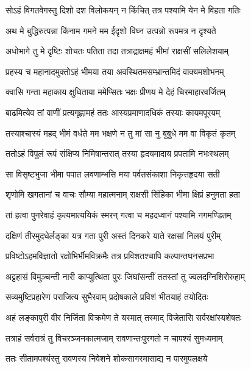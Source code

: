 \twolineshloka
{सोऽहं विगतवेगस्तु दिशो दश विलोकयन्}
{न किंचित् तत्र पश्यामि येन मे विहता गतिः} %

\twolineshloka
{अथ मे बुद्धिरुत्पन्ना किंनाम गमने मम}
{ईदृशो विघ्न उत्पन्नो रूपमत्र न दृश्यते} %

\twolineshloka
{अधोभागे तु मे दृष्टिः शोचतः पतिता तदा}
{तत्राद्राक्षमहं भीमां राक्षसीं सलिलेशयाम्} %

\twolineshloka
{प्रहस्य च महानादमुक्तोऽहं भीमया तया}
{अवस्थितमसम्भ्रान्तमिदं वाक्यमशोभनम्} %

\twolineshloka
{क्वासि गन्ता महाकाय क्षुधिताया ममेप्सितः}
{भक्षः प्रीणय मे देहं चिरमाहारवर्जितम्} %

\twolineshloka
{बाढमित्येव तां वाणीं प्रत्यगृह्णामहं ततः}
{आस्यप्रमाणादधिकं तस्याः कायमपूरयम्} %

\twolineshloka
{तस्याश्चास्यं महद् भीमं वर्धते मम भक्षणे}
{न तु मां सा नु बुबुधे मम वा विकृतं कृतम्} %

\twolineshloka
{ततोऽहं विपुलं रूपं संक्षिप्य निमिषान्तरात्}
{तस्या हृदयमादाय प्रपतामि नभःस्थलम्} %

\twolineshloka
{सा विसृष्टभुजा भीमा पपात लवणाम्भसि}
{मया पर्वतसंकाशा निकृत्तहृदया सती} %

\twolineshloka
{शृणोमि खगतानां च वाचः सौम्या महात्मनाम्}
{राक्षसी सिंहिका भीमा क्षिप्रं हनुमता हता} %

\twolineshloka
{तां हत्वा पुनरेवाहं कृत्यमात्ययिकं स्मरन्}
{गत्वा च महदध्वानं पश्यामि नगमण्डितम्} %

\twolineshloka
{दक्षिणं तीरमुदधेर्लङ्का यत्र गता पुरी}
{अस्तं दिनकरे याते रक्षसां निलयं पुरीम्} %

\twolineshloka
{प्रविष्टोऽहमविज्ञातो रक्षोभिर्भीमविक्रमैः}
{तत्र प्रविशतश्चापि कल्पान्तघनसप्रभा} %

\twolineshloka
{अट्टहासं विमुञ्चन्ती नारी काप्युत्थिता पुरः}
{जिघांसन्तीं ततस्तां तु ज्वलदग्निशिरोरुहाम्} %

\twolineshloka
{सव्यमुष्टिप्रहारेण पराजित्य सुभैरवाम्}
{प्रदोषकाले प्रविशं भीतयाहं तयोदितः} %

\twolineshloka
{अहं लङ्कापुरी वीर निर्जिता विक्रमेण ते}
{यस्मात् तस्माद् विजेतासि सर्वरक्षांस्यशेषतः} %

\twolineshloka
{तत्राहं सर्वरात्रं तु विचरञ्जनकात्मजाम्}
{रावणान्तःपुरगतो न चापश्यं सुमध्यमाम्} %

\twolineshloka
{ततः सीतामपश्यंस्तु रावणस्य निवेशने}
{शोकसागरमासाद्य न पारमुपलक्षये} %

